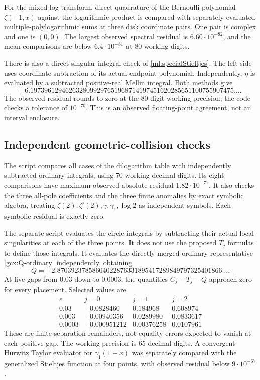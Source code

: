 For the mixed-log transform, direct quadrature of the Bernoulli
polynomial $\zeta(-1,x)$ against the logarithmic product is compared
with separately evaluated multiple-polylogarithmic sums at three disk
coordinate pairs. One pair is complex and one is $(0,0)$.
The largest observed spectral residual is
$6.60\cdot10^{-82}$, and the mean comparisons are below
$6.4\cdot10^{-81}$ at 80 working digits.

There is also a direct singular-integral check of
\eqref{ml:specialStieltjes}. The left side uses coordinate subtraction
of its actual endpoint polynomial. Independently, $\eta$ is evaluated
by a subtracted positive-real Mellin integral. Both methods give
\[
 -6.1973961294626328099297651968714197451620285651100755907475\ldots.
\]
The observed residual rounds to zero at the 80-digit working precision;
the code checks a tolerance of $10^{-70}$. This is an observed
floating-point agreement, not an interval enclosure.

\subsection{Independent geometric-collision checks}

The script  compares all cases of the
dilogarithm table with independently subtracted ordinary integrals,
using 70 working decimal digits. Its eight comparisons have maximum
observed absolute residual $1.82\cdot10^{-71}$.
It also checks the three all-pole coefficients and the three finite
anomalies by exact symbolic algebra, treating
$\zeta(2),\zeta'(2),\gamma,\gamma_1,\log2$ as independent symbols.
Each symbolic residual is exactly zero.

The separate script  evaluates the
circle integrals by subtracting their actual local singularities at
each of the three points. It does not use the proposed $T_j$ formulas
to define those integrals. It evaluates the directly merged ordinary
representative \eqref{gcx:Q-ordinary} independently, obtaining
\[
 Q=-2.87039237858604022876331895417289849797325401866\ldots.
\]
At five gaps from $0.03$ down to $0.0003$, the quantities $C_j-T_j-Q$
approach zero for every placement. Selected values are
\[
\begin{array}{c|rrr}
 \epsilon&j=0&j=1&j=2\\ \hline
 0.03&-0.0828460&0.184968&0.608974\\
 0.003&-0.00940356&0.0289980&0.0833617\\
 0.0003&-0.000951212&0.00376258&0.0107961
\end{array}
\]
These are finite-separation remainders, not equality errors expected
to vanish at each positive gap. The working precision is 65 decimal
digits. A convergent Hurwitz Taylor evaluator for $\gamma_1(1+x)$
was separately compared with the generalized Stieltjes function at
four points, with observed residual below $9\cdot10^{-67}$.

